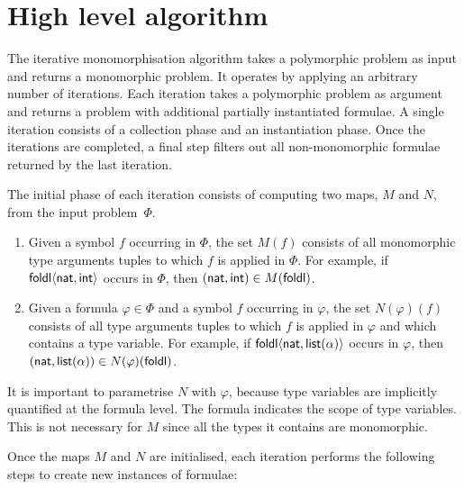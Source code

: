 \documentclass[runningheads]{llncs}
\begin{document}

\section{High level algorithm}
\label{sec:high level-algorithm}

The iterative monomorphisation algorithm takes a polymorphic problem as input and returns a monomorphic problem. It operates by applying an arbitrary number of iterations. Each iteration takes a polymorphic problem as argument and returns a problem with additional partially instantiated formulae. A single iteration consists of a collection phase and an instantiation phase. Once the iterations are completed, a final step filters out all non-monomorphic formulae returned by the last iteration.

The initial phase of each iteration consists of computing two maps, \(M\) and \(N\), from the input problem~$\Phi$.
%
\begin{enumerate}
\item[\labelitemi] Given a symbol \(f\) occurring in \(\Phi\), the set \(M(f)\) consists of all monomorphic type arguments tuples to which \(f\) is applied in \(\Phi\). For example, if \(\textsf{foldl}\langle \textsf{nat}, \textsf{int}\rangle\) occurs in \(\Phi\), then \((\textsf{nat}, \textsf{int}) \in M(\textsf{foldl}) \).

\item[\labelitemi] Given a formula \(\varphi \in \Phi\) and a symbol \(f\) occurring in \(\varphi\), the set \(N(\varphi)(f)\) consists of all type arguments tuples to which \(f\) is applied in \(\varphi\) and which contains a type variable. For example, if \(\textsf{foldl}\langle \textsf{nat}, \textsf{list}(\alpha)\rangle\) occurs in \(\varphi\), then \((\textsf{nat}, \textsf{list}(\alpha)) \in N(\varphi)(\textsf{foldl}) \).
\end{enumerate}

It is important to parametrise \(N\) with \(\varphi\), because type variables are implicitly quantified at the formula level. The formula indicates the scope of type variables. This is not necessary for \(M\) since all the types it contains are monomorphic.

Once the maps \(M\) and \(N\) are initialised, each iteration performs the following steps to create new instances of formulae:
\end{document}
